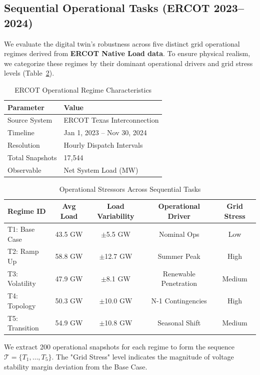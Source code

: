 \documentclass[journal,12pt,onecolumn]{IEEEtran}
\begin{document}
\subsection{Sequential Operational Tasks (ERCOT 2023--2024)}

We evaluate the digital twin's robustness across five distinct grid operational regimes derived from \textbf{ERCOT Native Load data}. To ensure physical realism, we categorize these regimes by their dominant operational drivers and grid stress levels (Table~\ref{tab:drift_injection}).

\begin{table}[htbp]
\caption{ERCOT Operational Regime Characteristics}
\label{tab:ercot_dataset}
\centering
\begin{tabular}{ll}
\toprule
\textbf{Parameter} & \textbf{Value} \\
\midrule
Source System & ERCOT Texas Interconnection \\
Timeline & Jan 1, 2023 -- Nov 30, 2024 \\
Resolution & Hourly Dispatch Intervals \\
Total Snapshots & 17,544 \\
Observable & Net System Load (MW) \\
\bottomrule
\end{tabular}
\end{table}

\begin{table}[htbp]
\caption{Operational Stressors Across Sequential Tasks}
\label{tab:drift_injection}
\centering
\begin{tabular}{lcccc}
\toprule
\textbf{Regime ID} & \textbf{Avg Load} & \textbf{Load Variability} & \textbf{Operational Driver} & \textbf{Grid Stress} \\
\midrule
T1: Base Case & 43.5 GW & $\pm$5.5 GW & Nominal Ops & Low \\
T2: Ramp Up & 58.8 GW & $\pm$12.7 GW & Summer Peak & High \\
T3: Volatility & 47.9 GW & $\pm$8.1 GW & Renewable Penetration & Medium \\
T4: Topology & 50.3 GW & $\pm$10.0 GW & N-1 Contingencies & High \\
T5: Transition & 54.9 GW & $\pm$10.8 GW & Seasonal Shift & Medium \\
\bottomrule
\end{tabular}
\end{table}

We extract 200 operational snapshots for each regime to form the sequence $\mathcal{T} = \{T_1, \dots, T_5\}$. The "Grid Stress" level indicates the magnitude of voltage stability margin deviation from the Base Case.
\end{document}

